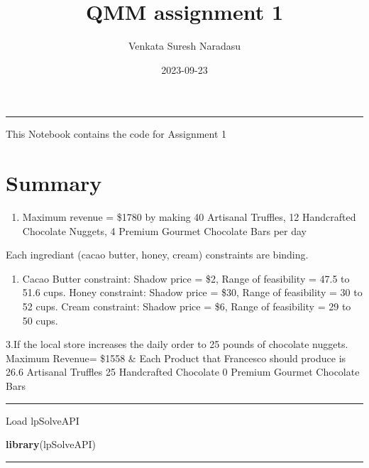 \documentclass[
]{article}
\title{QMM assignment 1}
\author{Venkata Suresh Naradasu}
\date{2023-09-23}
\newenvironment{Shaded}{\begin{snugshade}}{\end{snugshade}}
\newcommand{\FunctionTok}[1]{\textcolor[rgb]{0.13,0.29,0.53}{\textbf{#1}}}
\newcommand{\NormalTok}[1]{#1}
\providecommand{\tightlist}{%
  \setlength{\itemsep}{0pt}\setlength{\parskip}{0pt}}
\begin{document}
\maketitle

\begin{center}\rule{0.5\linewidth}{0.5pt}\end{center}

This Notebook contains the code for Assignment 1

\hypertarget{summary}{%
\section{Summary}\label{summary}}

\begin{enumerate}
\def\labelenumi{\arabic{enumi}.}
\tightlist
\item
  Maximum revenue = \$1780 by making 40 Artisanal Truffles, 12
  Handcrafted Chocolate Nuggets, 4 Premium Gourmet Chocolate Bars per
  day
\end{enumerate}

Each ingrediant (cacao butter, honey, cream) constraints are binding.

\begin{enumerate}
\def\labelenumi{\arabic{enumi}.}
\setcounter{enumi}{1}
\tightlist
\item
  Cacao Butter constraint: Shadow price = \$2, Range of feasibility =
  47.5 to 51.6 cups. Honey constraint: Shadow price = \$30, Range of
  feasibility = 30 to 52 cups. Cream constraint: Shadow price = \$6,
  Range of feasibility = 29 to 50 cups.
\end{enumerate}

3.If the local store increases the daily order to 25 pounds of chocolate
nuggets. Maximum Revenue= \$1558 \& Each Product that Francesco should
produce is 26.6 Artisanal Truffles 25 Handcrafted Chocolate 0 Premium
Gourmet Chocolate Bars

\begin{center}\rule{0.5\linewidth}{0.5pt}\end{center}

Load lpSolveAPI

\begin{Shaded}
\begin{Highlighting}[]
\FunctionTok{library}\NormalTok{(lpSolveAPI)}
\end{Highlighting}
\end{Shaded}

\begin{center}\rule{0.5\linewidth}{0.5pt}\end{center}
\end{document}
